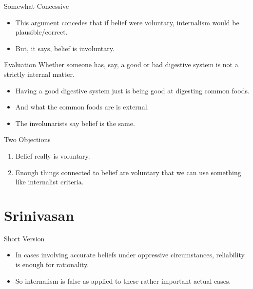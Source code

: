 \documentclass[
  17pt,
  letterpaper,
  ignorenonframetext,
  aspectratio=169,
]{beamer}
\providecommand{\tightlist}{%
  \setlength{\itemsep}{0pt}\setlength{\parskip}{0pt}}\usepackage{longtable,booktabs,array}
\begin{document}
\begin{frame}{Somewhat Concessive}
\protect\hypertarget{somewhat-concessive}{}
\begin{itemize}[<+->]
\tightlist
\item
  This argument concedes that if belief were voluntary, internalism
  would be plausible/correct.
\item
  But, it says, belief is involuntary.
\end{itemize}
\end{frame}

\begin{frame}{Evaluation}
\protect\hypertarget{evaluation}{}
Whether someone has, say, a good or bad digestive system is not a
strictly internal matter.

\begin{itemize}[<+->]
\tightlist
\item
  Having a good digestive system just is being good at digesting common
  foods.
\item
  And what the common foods are is external.
\item
  The involunarists say belief is the same.
\end{itemize}
\end{frame}

\begin{frame}{Two Objections}
\protect\hypertarget{two-objections}{}
\begin{enumerate}[<+->]
\tightlist
\item
  Belief really is voluntary.
\item
  Enough things connected to belief are voluntary that we can use
  something like internalist criteria.
\end{enumerate}
\end{frame}

\hypertarget{srinivasan}{%
\section{Srinivasan}\label{srinivasan}}

\begin{frame}{Short Version}
\protect\hypertarget{short-version}{}
\begin{itemize}[<+->]
\tightlist
\item
  In cases involving accurate beliefs under oppressive circumstances,
  reliability is enough for rationality.
\item
  So internalism is false as applied to these rather important actual
  cases.
\end{itemize}
\end{frame}
\end{document}

